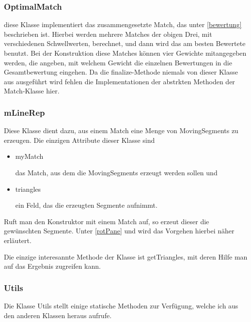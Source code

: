 \subsubsection{OptimalMatch}

diese Klasse implementiert das zusammengesetzte Match, das unter \ref{bewertung} beschrieben ist. Hierbei werden mehrere Matches der obigen Drei, mit verschiedenen Schwellwerten, berechnet, und dann wird das am besten Bewertete benutzt. Bei der Konstruktion diese Matches können vier Gewichte mitangegeben werden, die angeben, mit welchem Gewicht die einzelnen Bewertungen in die Gesamtbewertung eingehen. Da die finalize-Methode niemals von dieser Klasse aus ausgeführt wird fehlen die Implementationen der abstrkten Methoden der Match-Klasse hier.

\subsubsection{mLineRep}

Diese Klasse dient dazu, aus einem Match eine Menge von MovingSegments zu erzeugen. Die einzigen Attribute dieser Klasse sind
\begin{itemize}

\item  myMatch

das Match, aus dem die MovingSegments erzeugt werden sollen und

\item triangles

ein Feld, das die erzeugten Segmente aufnimmt.

\end{itemize}

Ruft man den Konstruktor mit einem Match auf, so erzeut dieser die gewünschten Segmente. Unter \ref{rotPane} und  wird das Vorgehen hierbei näher erläutert.

Die einzige interesannte Methode der Klasse ist getTriangles, mit deren Hilfe man auf das Ergebnis zugreifen kann.

\subsubsection{Utils}

Die Klasse Utils stellt einige statische Methoden zur Verfügung, welche ich aus den anderen Klassen heraus aufrufe.

